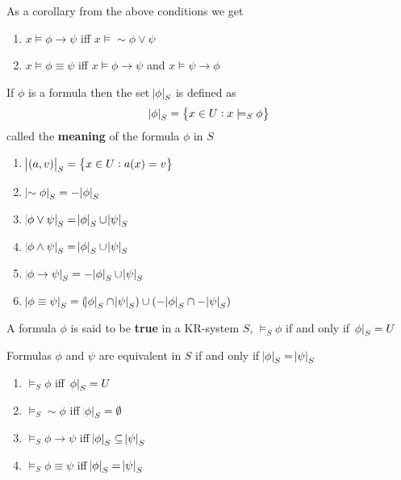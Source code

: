 \documentclass[11pt]{article}
\begin{document}
As a corollary from the above conditions we get
\begin{enumerate}
\item \(x\models\phi\to\psi\) iff \(x\models\sim\phi\vee\psi\)
\item \(x\models\phi\equiv\psi\) iff \(x\models\phi\to\psi\) and \(x\models\psi\to\phi\)
\end{enumerate}


If \(\phi\) is a formula then the set \(\abs{\phi}_S\) is defined as
\begin{equation*}
\abs{\phi}_S=\left\{ x\in U:x\models_S\phi\right\}
\end{equation*}
called the \textbf{meaning} of the formula \(\phi\) in \(S\)

\begin{proposition}[7.1]
\begin{enumerate}
\item \(\abs{(a,v)}_S=\left\{ x\in U:a(x)=v\right\}\)
\item \(\abs{\sim\phi}_S=-\abs{\phi}_S\)
\item \(\abs{\phi\vee\psi}_S=\abs{\phi}_S\cup\abs{\psi}_S\)
\item \(\abs{\phi\wedge\psi}_S=\abs{\phi}_S \cup\abs{\psi}_S\)
\item \(\abs{\phi\to\psi}_S=-\abs{\phi}_S \cup\abs{\psi}_S\)
\item \(\abs{\phi\equiv\psi}_S=(\abs{\phi}_S \cap\abs{\psi}_S)\cup(-\abs{\phi}_S \cap-\abs{\psi}_S)\)
\end{enumerate}
\end{proposition}

A formula \(\phi\) is said to be \textbf{true} in a KR-system \(S\), \(\models_S\phi\) if and only
if \(\abs{\phi}_S=U\)

Formulas \(\phi\) and \(\psi\) are equivalent in \(S\) if and only if \(\abs{\phi}_S=\abs{\psi}_S\)

\begin{proposition}[7.2]
\begin{enumerate}
\item \(\models_S \phi\) iff \(\abs{\phi}_S=U\)
\item \(\models_S \sim\phi\) iff \(\abs{\phi}_S=\emptyset\)
\item \(\models_S \phi\to\psi\) iff \(\abs{\phi}_S \subseteq\abs{\psi}_S\)
\item \(\models_S \phi\equiv\psi\) iff \(\abs{\phi}_S=\abs{\psi}_S\)
\end{enumerate}
\end{proposition}
\end{document}
